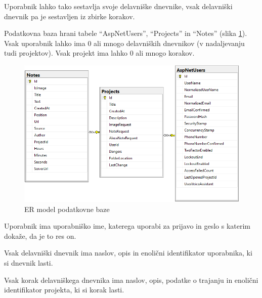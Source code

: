 \documentclass[a4paper, 12pt]{book}
\begin{document}
Uporabnik lahko tako sestavlja svoje delavniške dnevnike, vsak delavniški dnevnik pa je sestavljen iz zbirke korakov.

Podatkovna baza hrani tabele \enquote{AspNetUsers}, \enquote{Projects} in \enquote{Notes} (slika \ref{er_diagram}).
Vsak uporabnik lahko ima 0 ali mnogo delavniških dnevnikov (v nadaljevanju tudi projektov).
Vsak projekt ima lahko 0 ali mnogo korakov.

\begin{figure}[H]
\begin{center}
\includegraphics[width=13.5cm]{er_diagram_small}
\end{center}
\caption{ER model podatkovne baze}
\label{er_diagram}
\end{figure}

Uporabnik ima uporabniško ime, katerega uporabi za prijavo in geslo s katerim dokaže, da je to res on.

Vsak delavniški dnevnik ima naslov, opis in enolični identifikator uporabnika, ki si dnevnik lasti.

Vsak korak delavniškega dnevnika ima naslov, opis, podatke o trajanju in enolični identifikator projekta, ki si korak lasti.


\end{document}
